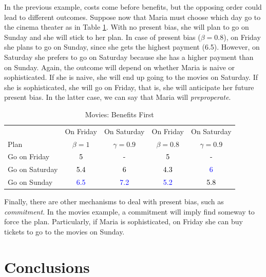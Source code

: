 \documentclass[]{article}
\begin{document}
In the previous example, costs come before benefits, but the opposing order could lead to different outcomes. Suppose now that Maria must choose which day go to the cinema theater as in Table \ref{tab:s2}. With no present bias, she will plan to go on Sunday and she will stick to her plan. In case of present bias (\(\beta = 0.8\)), on Friday she plans to go on Sunday, since she gets the highest payment (6.5). However, on Saturday she prefers to go on Saturday because she has a higher payment than on Sunday. Again, the outcome will depend on whether Maria is naive or sophisticated. If she is naive, she will end up going to the movies on Saturday. If she is sophisticated, she will go on Friday, that is, she will anticipate her future present bias. In the latter case, we can say that Maria will \emph{preproperate}.

\begin{table}

\caption{\label{tab:s2}Movies: Benefits First}
\centering
\begin{tabular}[t]{lcccc}
\toprule
\multicolumn{1}{c}{} & \multicolumn{1}{c}{On Friday} & \multicolumn{1}{c}{On Saturday} & \multicolumn{1}{c}{On Friday} & \multicolumn{1}{c}{On Saturday} \\
\cmidrule(l{3pt}r{3pt}){2-2} \cmidrule(l{3pt}r{3pt}){3-3} \cmidrule(l{3pt}r{3pt}){4-4} \cmidrule(l{3pt}r{3pt}){5-5}
Plan & $\beta = 1$ & $\gamma = 0.9$ & $\beta= 0.8$ & $\gamma = 0.9$\\
\midrule
Go on Friday & \textcolor{black}{5} & \textcolor{black}{-} & \textcolor{black}{5} & \textcolor{black}{-}\\
Go on Saturday & \textcolor{black}{5.4} & \textcolor{black}{6} & \textcolor{black}{4.3} & \textcolor{blue}{6}\\
Go on Sunday & \textcolor{blue}{6.5} & \textcolor{blue}{7.2} & \textcolor{blue}{5.2} & \textcolor{black}{5.8}\\
\bottomrule
\end{tabular}
\end{table}

Finally, there are other mechanisms to deal with present bias, such as \emph{commitment}. In the movies example, a commitment will imply find someway to force the plan. Particularly, if Maria is sophisticated, on Friday she can buy tickets to go to the movies on Sunday.

\hypertarget{conclusions}{%
\section{Conclusions}\label{conclusions}}
\end{document}
